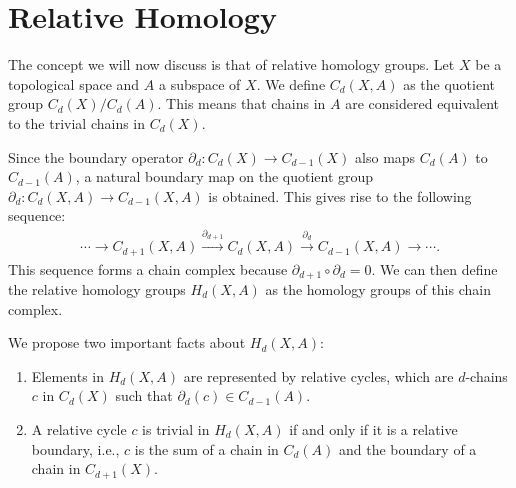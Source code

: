 \section{Relative Homology}
\label{RelativeHomology}
The concept we will now discuss is that of relative homology groups. Let \( X \) be a topological space and \( A \) a subspace of \( X \). We define \( C_{d}(X, A) \) as the quotient group \( C_{d}(X) / C_{d}(A) \). This means that chains in \( A \) are considered equivalent to the trivial chains in \( C_{d}(X) \).

Since the boundary operator \( \partial_{d}: C_{d}(X) \rightarrow C_{d-1}(X) \) also maps \( C_{d}(A) \) to \( C_{d-1}(A) \), a natural boundary map on the quotient group \( \partial_{d}: C_{d}(X, A) \rightarrow C_{d-1}(X, A) \) is obtained. This gives rise to the following sequence:
\begin{align}
	\cdots \rightarrow C_{d+1}(X, A) \xrightarrow{\partial_{d+1}} C_{d}(X, A) \xrightarrow{\partial_{d}} C_{d-1}(X, A) \rightarrow \cdots. 
\end{align}
This sequence forms a chain complex because \( \partial_{d+1} \circ \partial_{d} = 0 \). We can then define the relative homology groups \( H_{d}(X, A) \) as the homology groups of this chain complex.

We propose two important facts about \( H_{d}(X, A) \):

\begin{proposition}{\cite[\S 2.1]{hatcher2005algebraic}}
	\begin{enumerate}
		\item Elements in \( H_{d}(X, A) \) are represented by relative cycles, which are \( d \)-chains \( c \) in \( C_{d}(X) \) such that \( \partial_{d}(c) \in C_{d-1}(A) \).
		\item A relative cycle \( c \) is trivial in \( H_{d}(X, A) \) if and only if it is a relative boundary, i.e., \( c \) is the sum of a chain in \( C_{d}(A) \) and the boundary of a chain in \( C_{d+1}(X) \).
	\end{enumerate}
\end{proposition}

